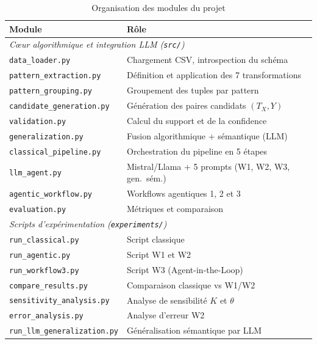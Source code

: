 \documentclass[12pt,a4paper]{article}
\begin{document}
\begin{table}[H]
\centering
\caption{Organisation des modules du projet}
\label{tab:modules}
\small
\begin{tabularx}{\linewidth}{@{}lX@{}}
\toprule
\textbf{Module} & \textbf{R\^{o}le} \\
\midrule
\multicolumn{2}{l}{\textit{C\oe{}ur algorithmique et integration LLM (\texttt{src/})}} \\
\midrule
\texttt{data\_loader.py} & Chargement CSV, introspection du sch\'{e}ma \\
\texttt{pattern\_extraction.py} & D\'{e}finition et application des 7 transformations \\
\texttt{pattern\_grouping.py} & Groupement des tuples par pattern \\
\texttt{candidate\_generation.py} & G\'{e}n\'{e}ration des paires candidats $(T_X, Y)$ \\
\texttt{validation.py} & Calcul du support et de la confidence \\
\texttt{generalization.py} & Fusion algorithmique + s\'{e}mantique (LLM) \\
\texttt{classical\_pipeline.py} & Orchestration du pipeline en 5 \'{e}tapes \\
\texttt{llm\_agent.py} & Mistral/Llama + 5 prompts (W1, W2, W3, gen.\ s\'{e}m.) \\
\texttt{agentic\_workflow.py} & Workflows agentiques 1, 2 et 3 \\
\texttt{evaluation.py} & M\'{e}triques et comparaison \\
\midrule
\multicolumn{2}{l}{\textit{Scripts d'exp\'{e}rimentation (\texttt{experiments/})}} \\
\midrule
\texttt{run\_classical.py} & Script classique \\
\texttt{run\_agentic.py} & Script W1 et W2 \\
\texttt{run\_workflow3.py} & Script W3 (Agent-in-the-Loop) \\
\texttt{compare\_results.py} & Comparaison classique vs W1/W2 \\
\texttt{sensitivity\_analysis.py} & Analyse de sensibilit\'{e} $K$ et $\theta$ \\
\texttt{error\_analysis.py} & Analyse d'erreur W2 \\
\texttt{run\_llm\_generalization.py} & G\'{e}n\'{e}ralisation s\'{e}mantique par LLM \\
\bottomrule
\end{tabularx}
\end{table}
\end{document}
